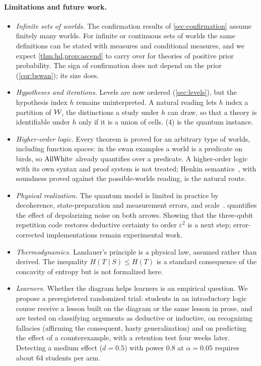 \paragraph{Limitations and future work.}
\begin{itemize}
  \item \emph{Infinite sets of worlds.} The confirmation results of \cref{sec:confirmation} assume
        finitely many worlds. For infinite or continuous sets of worlds the same definitions can be
        stated with measures and conditional measures, and we expect
        \cref{thm:hd,prop:ascend} to carry over for theories of positive prior probability. The
        sign of confirmation does not depend on the prior (\cref{cor:bswan}); its size does.
  \item \emph{Hypotheses and iterations.} Levels are now ordered (\cref{sec:levels}), but the
        hypothesis index $h$ remains uninterpreted. A natural reading lets $h$ index a partition of
        $\mathcal W$, the distinctions a study under $h$ can draw, so that a theory is identifiable under
        $h$ only if it is a union of cells. (4) is the quantum instance.
  \item \emph{Higher-order logic.} Every theorem is proved for an arbitrary type of worlds,
        including function spaces: in the swan examples a world is a predicate on birds, so $\mathrm{AllWhite}$
        already quantifies over a predicate. A higher-order logic with its own syntax and proof
        system is not treated; Henkin semantics~\cite{henkin}, with soundness proved against the
        possible-worlds reading, is the natural route.
  \item \emph{Physical realization.} The quantum model is limited in practice by decoherence,
        state-preparation and measurement errors, and scale~\cite{preskill,arute}.
         quantifies the effect of depolarizing noise on both arrows. Showing that
        the three-qubit repetition code restores deductive certainty to order $\varepsilon^2$ is a
        next step; error-corrected implementations remain experimental work.
  \item \emph{Thermodynamics.} Landauer's principle is a physical law, assumed rather than
        derived. The inequality $H(T\mid S)\le H(T)$ is a standard consequence of the concavity of
        entropy but is not formalized here.
  \item \emph{Learners.} Whether the diagram helps learners is an empirical question. We propose a
        preregistered randomized trial: students in an introductory logic course receive a lesson
        built on the diagram or the same lesson in prose, and are tested on classifying arguments
        as deductive or inductive, on recognizing fallacies (affirming the consequent, hasty
        generalization) and on predicting the effect of a counterexample, with a retention test
        four weeks later. Detecting a medium effect ($d=0.5$) with power $0.8$ at $\alpha=0.05$
        requires about $64$ students per arm.
\end{itemize}

